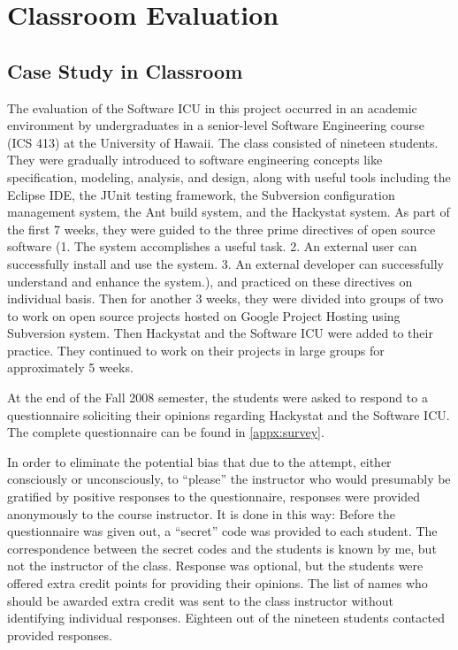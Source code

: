 \chapter{Classroom Evaluation}

\section{Case Study in Classroom}
The evaluation of the Software ICU in this project occurred in an academic environment by undergraduates in a senior-level Software Engineering course (ICS 413) at the University of Hawaii. The class consisted of nineteen students. They were gradually introduced to software engineering concepts like specification, modeling, analysis, and design, along with useful tools including the Eclipse IDE, the JUnit testing framework, the Subversion configuration management system, the Ant build system, and the Hackystat system. As part of the first 7 weeks, they were guided to the three prime directives of open source software (1. The system accomplishes a useful task. 2. An external user can successfully install and use the system. 3. An external developer can successfully understand and enhance the system.), and practiced on these directives on individual basis. Then for another 3 weeks, they were divided into groups of two to work on open source projects hosted on Google Project Hosting using Subversion system. Then Hackystat and the Software ICU were added to their practice. They continued to work on their projects in large groups for approximately 5 weeks.

At the end of the Fall 2008 semester, the students were asked to respond to a questionnaire soliciting their opinions regarding Hackystat and the Software ICU. The complete questionnaire can be found in \autoref{appx:survey}. 

In order to eliminate the potential bias that due to the attempt, either consciously or unconsciously, to ``please'' the instructor who would presumably be gratified by positive responses to the questionnaire, responses were provided anonymously to the course instructor. It is done in this way: Before the questionnaire was given out, a ``secret'' code was provided to each student. The correspondence between the secret codes and the students is known by me, but not the instructor of the class. Response was optional, but the students were offered extra credit points for providing their opinions. The list of names who should be awarded extra credit was sent to the class instructor without identifying individual responses. Eighteen out of the nineteen students contacted provided responses. 

